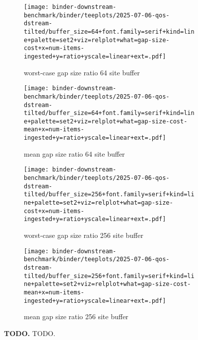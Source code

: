\begin{figure*}

\begin{subfigure}{0.55\linewidth}
    \centering
    \texttt{[image: binder-downstream-benchmark/binder/teeplots/2025-07-06-qos-dstream-tilted/buffer\_size=64+font.family=serif+kind=line+palette=set2+viz=relplot+what=gap-size-cost+x=num-items-ingested+y=ratio+yscale=linear+ext=.pdf]}%
    \caption{worst-case gap size ratio 64 site buffer}
    \label{fig:qos-ratio:max64}
\end{subfigure}%
\begin{subfigure}{0.45\linewidth}
    \centering
    \texttt{[image: binder-downstream-benchmark/binder/teeplots/2025-07-06-qos-dstream-tilted/buffer\_size=64+font.family=serif+kind=line+palette=set2+viz=relplot+what=gap-size-cost-mean+x=num-items-ingested+y=ratio+yscale=linear+ext=.pdf]}%
    \caption{mean gap size ratio 64 site buffer}
    \label{fig:qos-ratio:mean64}
\end{subfigure}

\begin{subfigure}{0.55\linewidth}
    \centering
    \texttt{[image: binder-downstream-benchmark/binder/teeplots/2025-07-06-qos-dstream-tilted/buffer\_size=256+font.family=serif+kind=line+palette=set2+viz=relplot+what=gap-size-cost+x=num-items-ingested+y=ratio+yscale=linear+ext=.pdf]}%
    \caption{worst-case gap size ratio 256 site buffer}
    \label{fig:qos-ratio:max256}
\end{subfigure}%
\begin{subfigure}{0.45\linewidth}
    \centering
    \texttt{[image: binder-downstream-benchmark/binder/teeplots/2025-07-06-qos-dstream-tilted/buffer\_size=256+font.family=serif+kind=line+palette=set2+viz=relplot+what=gap-size-cost-mean+x=num-items-ingested+y=ratio+yscale=linear+ext=.pdf]}%
    \caption{mean gap size ratio 256 site buffer}
    \label{fig:qos-ratio:mean256}
\end{subfigure}

\caption{%
\textbf{TODO.}
\small
TODO.
}
\label{fig:qos-ratio}

\end{figure*}
